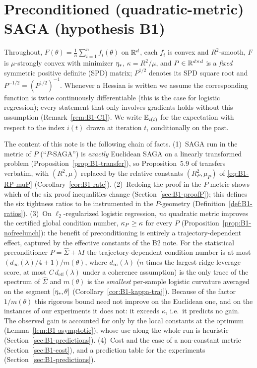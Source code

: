 \section{Preconditioned (quadratic-metric) SAGA (hypothesis B1)}
\label{sec:B1}

Throughout, $F(\theta)=\frac1n\sum_{i=1}^n f_i(\theta)$ on $\mathbb{R}^d$, each $f_i$ is convex and $R^2$-smooth,
$F$ is $\mu$-strongly convex with minimizer $\eta_\ast$, $\kappa=R^2/\mu$, and $P\in\mathbb{R}^{d\times d}$ is a
\emph{fixed} symmetric positive definite (SPD) matrix; $P^{1/2}$ denotes its SPD square root and
$P^{-1/2}=(P^{1/2})^{-1}$. Whenever a Hessian is written we assume the corresponding function is twice
continuously differentiable (this is the case for logistic regression); every statement that only involves
gradients holds without this assumption (Remark~\ref{rem:B1-C1}). We write $\mathbb{E}_{i(t)}$ for the expectation with
respect to the index $i(t)$ drawn at iteration $t$, conditionally on the past.

The content of this note is the following chain of facts.
(1)~SAGA run in the metric of $P$ (``$P$-SAGA'') is \emph{exactly} Euclidean SAGA on a linearly
transformed problem (Proposition~\ref{prop:B1-transfer}), so Proposition~5.9 of \cite{bach2024learning}
transfers verbatim, with $(R^2,\mu)$ replaced by the relative constants $(R_P^2,\mu_P)$ of
\eqref{eq:B1-RP-muP} (Corollary~\ref{cor:B1-rate}). (2)~Redoing the proof in the $P$-metric shows which of
the six proof inequalities change (Section~\ref{sec:B1-proofP}); this defines the six tightness ratios to be
instrumented in the $P$-geometry (Definition~\ref{def:B1-ratios}). (3)~On $\ell_2$-regularized logistic
regression, \emph{no} quadratic metric improves the certified global condition number, $\kappa_P\ge\kappa$ for
every $P$ (Proposition~\ref{prop:B1-nofreelunch}): the benefit of preconditioning is entirely a
trajectory-dependent effect, captured by the effective constants of the B2 note. For the statistical
preconditioner $P=\hat\Sigma+\lambda I$ the trajectory-dependent condition number is at most
$(d_\infty(\lambda)/4+1)/m(\theta)$, where $d_\infty(\lambda)$ ($n$ times the largest ridge leverage score, at
most $C\,d_{\mathrm{eff}}(\lambda)$ under a coherence assumption) is the only trace of the spectrum of
$\hat\Sigma$ and $m(\theta)$ is the \emph{smallest} per-sample logistic curvature averaged on the segment
$[\eta_\ast,\theta]$ (Corollary~\ref{cor:B1-kappa-traj}). Because of the factor $1/m(\theta)$ this rigorous
bound need not improve on the Euclidean one, and on the instances of our experiments it does not: it exceeds
$\kappa$, i.e.\ it predicts no gain. The observed gain is accounted for only by the local constants at the
optimum (Lemma~\ref{lem:B1-asymptotic}), whose use along the whole run is heuristic
(Section~\ref{sec:B1-predictions}). (4)~Cost and the case of a non-constant metric
(Section~\ref{sec:B1-cost}), and a prediction table for the experiments (Section~\ref{sec:B1-predictions}).

